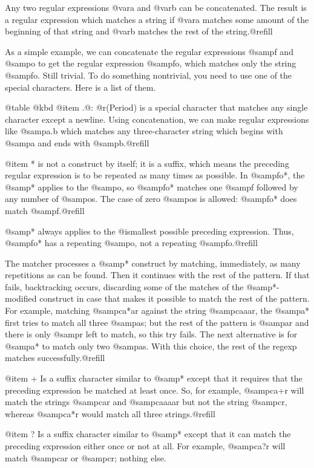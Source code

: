 {{{{{{{{{{Any two regular expressions @var{a} and @var{b} can be concatenated.  The
result is a regular expression which matches a string if @var{a} matches
some amount of the beginning of that string and @var{b} matches the rest of
the string.@refill

As a simple example, we can concatenate the regular expressions @samp{f}
and @samp{o} to get the regular expression @samp{fo}, which matches only
the string @samp{fo}.  Still trivial.  To do something nontrivial, you
need to use one of the special characters.  Here is a list of them.

@table @kbd
@item .@: @r{(Period)}
is a special character that matches any single character except a newline.
Using concatenation, we can make regular expressions like @samp{a.b} which
matches any three-character string which begins with @samp{a} and ends with
@samp{b}.@refill

@item *
is not a construct by itself; it is a suffix, which means the
preceding regular expression is to be repeated as many times as
possible.  In @samp{fo*}, the @samp{*} applies to the @samp{o}, so
@samp{fo*} matches one @samp{f} followed by any number of @samp{o}s.
The case of zero @samp{o}s is allowed: @samp{fo*} does match
@samp{f}.@refill

@samp{*} always applies to the @i{smallest} possible preceding
expression.  Thus, @samp{fo*} has a repeating @samp{o}, not a
repeating @samp{fo}.@refill

The matcher processes a @samp{*} construct by matching, immediately,
as many repetitions as can be found.  Then it continues with the rest
of the pattern.  If that fails, backtracking occurs, discarding some
of the matches of the @samp{*}-modified construct in case that makes
it possible to match the rest of the pattern.  For example, matching
@samp{ca*ar} against the string @samp{caaar}, the @samp{a*} first
tries to match all three @samp{a}s; but the rest of the pattern is
@samp{ar} and there is only @samp{r} left to match, so this try fails.
The next alternative is for @samp{a*} to match only two @samp{a}s.
With this choice, the rest of the regexp matches successfully.@refill

@item +
Is a suffix character similar to @samp{*} except that it requires that
the preceding expression be matched at least once.  So, for example,
@samp{ca+r} will match the strings @samp{car} and @samp{caaaar}
but not the string @samp{cr}, whereas @samp{ca*r} would match all
three strings.@refill

@item ?
Is a suffix character similar to @samp{*} except that it can match the
preceding expression either once or not at all.  For example,
@samp{ca?r} will match @samp{car} or @samp{cr}; nothing else.

}}}}}}}}}}

